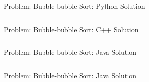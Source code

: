 \documentclass[11pt,pdf, aspectratio=169]{beamer}
\begin{document}
  \begin{frame}[containsverbatim]{ Problem: Bubble-bubble Sort: Python Solution}
    \inputminted{python}{code/session-1/python/interactive-example.py}
  \end{frame}
  \begin{frame}[containsverbatim]{ Problem: Bubble-bubble Sort: C++ Solution}
    \inputminted[fontsize=\tiny]{c++}{code/session-1/c++/interactive-example.cpp}
  \end{frame}
  \begin{frame}[containsverbatim]{ Problem: Bubble-bubble Sort: Java Solution}
    \inputminted[fontsize=\tiny]{java}{code/session-1/java/InteractiveExample.java}
  \end{frame}
  \begin{frame}[containsverbatim]{ Problem: Bubble-bubble Sort: Java Solution}
    \inputminted{kotlin}{code/session-1/kotlin/interactive-example.kt}
  \end{frame}
\end{document}
